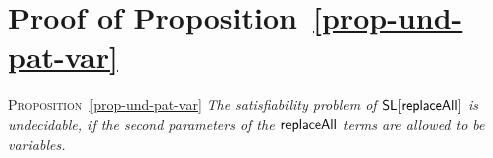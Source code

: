 \appendix
 


\section{Proof of Proposition~\ref{prop-und-pat-var}}

\noindent \textsc{Proposition}~\ref{prop-und-pat-var}
{\em The satisfiability problem of $\mathsf{SL}[\mathsf{replaceAll}]$ is undecidable, if the second parameters of the $\mathsf{replaceAll}$ terms are allowed to be variables.
}

